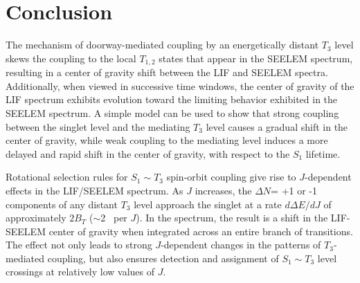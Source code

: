 \documentclass[12pt]{mitthesis}
\begin{document}






























\section{Conclusion}

The mechanism of doorway-mediated coupling by an energetically distant
$T_3$ level skews the coupling to the local $T_{1,2}$ states that
appear in the SEELEM spectrum, resulting in a center of gravity shift
between the LIF and SEELEM spectra.  Additionally, when viewed in
successive time windows, the center of gravity of the LIF spectrum
exhibits evolution toward the limiting behavior exhibited in the
SEELEM spectrum.  A simple model can be used to show that strong
coupling between the singlet level and the mediating $T_3$ level
causes a gradual shift in the center of gravity, while weak coupling
to the mediating level induces a more delayed and rapid shift in the
center of gravity, with respect to the $S_1$ lifetime.

Rotational selection rules for $S_1 \sim T_3$ spin-orbit coupling give
rise to $J$-dependent effects in the LIF/SEELEM spectrum.  As $J$
increases, the $\Delta N$= +1 or -1 components of any distant $T_3$
level approach the singlet at a rate $d\Delta E / dJ$ of approximately
$2B_T$ ($\sim$2 \rcm\ per $J$).  In the spectrum, the result is a
shift in the LIF-SEELEM center of gravity when integrated across an
entire branch of transitions.  The effect not only leads to strong
$J$-dependent changes in the patterns of $T_3$-mediated coupling, but
also ensures detection and assignment of $S_1 \sim T_3$ level
crossings at relatively low values of $J$.
\end{document}
